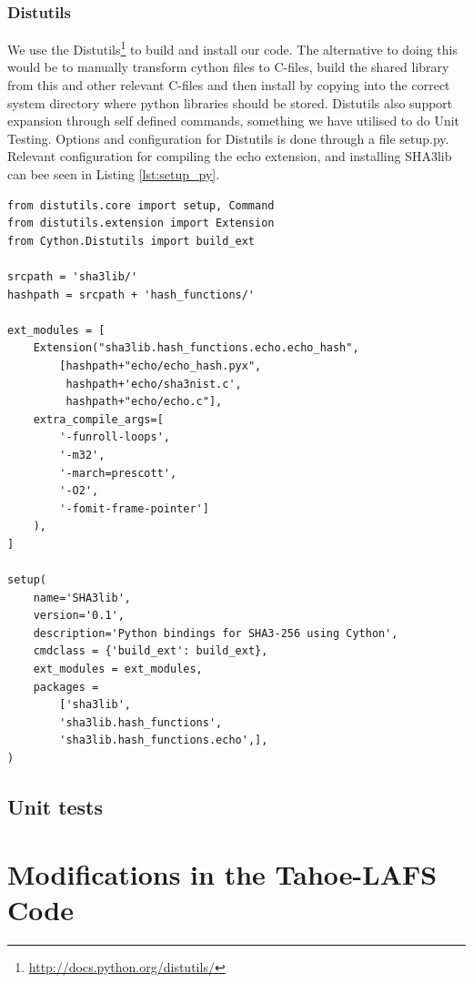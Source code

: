 \documentclass[english,12pt,a4paper]{book}
\begin{document}
\subsubsection{\ac{Distutils}} We use the
\ac{Distutils}\footnote{\url{http://docs.python.org/distutils/}} to build and
install our code. The alternative to doing this would be to manually transform
cython files to C-files, build the shared library from this and other relevant
C-files and then install by copying into the correct system directory where
python libraries should be stored. \ac{Distutils} also support expansion
through self defined commands, something we have utilised to do Unit Testing.
Options and configuration for \ac{Distutils} is done through a file setup.py.
Relevant configuration for compiling the echo extension, and installing SHA3lib
can bee seen in Listing \ref{lst:setup_py}.


\begin{lstlisting}[label=lst:setup_py, caption=Compiling echo from \ac{Distutils}]
from distutils.core import setup, Command
from distutils.extension import Extension
from Cython.Distutils import build_ext

srcpath = 'sha3lib/'
hashpath = srcpath + 'hash_functions/'

ext_modules = [
    Extension("sha3lib.hash_functions.echo.echo_hash",
        [hashpath+"echo/echo_hash.pyx", 
         hashpath+'echo/sha3nist.c', 
         hashpath+"echo/echo.c"],
    extra_compile_args=[
        '-funroll-loops',
        '-m32',
        '-march=prescott',
        '-O2',
        '-fomit-frame-pointer']
    ),
]

setup(
    name='SHA3lib',
    version='0.1',
    description='Python bindings for SHA3-256 using Cython',
    cmdclass = {'build_ext': build_ext},
    ext_modules = ext_modules,
    packages =
        ['sha3lib',
        'sha3lib.hash_functions',
        'sha3lib.hash_functions.echo',],
)

\end{lstlisting}



\subsection{Unit tests}

\section{Modifications in the Tahoe-\ac{LAFS} Code}
\end{document}
